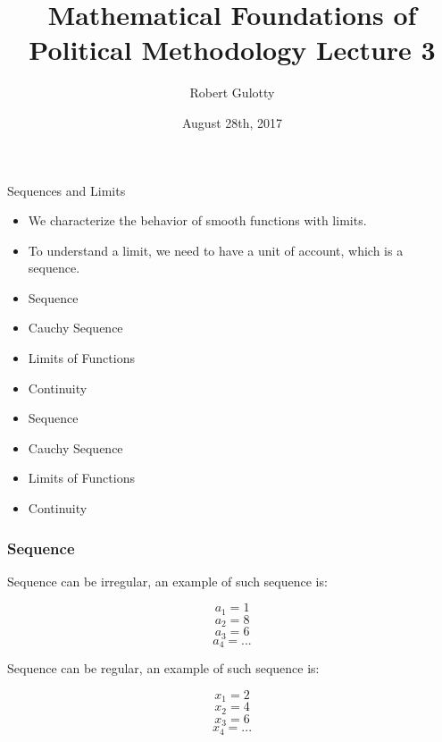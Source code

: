 \documentclass[handout]{beamer}
\title[PLSC 43401] %
{Mathematical Foundations of Political Methodology Lecture 3}
\author{Robert Gulotty}
\institute[University of Chicago]{Department of Political Science \\  University of Chicago}
\date{August 28th, 2017}
\numberwithin{equation}{section}
\begin{document}
\begin{frame}
\titlepage
\end{frame}



\begin{frame}{Sequences and Limits}
\begin{itemize}
\item We characterize the behavior of smooth functions with limits.
\item To understand a limit, we need to have a unit of account, which is a sequence.
\end{itemize}
\end{frame}


\begin{frame}

\begin{itemize}
\item \textcolor{myblack}{Sequence}

\item \textcolor{myblack}{Cauchy Sequence}
\item \textcolor{myblack}{Limits of Functions}
\item \textcolor{myblack}{Continuity}
\end{itemize}

\end{frame}



\begin{frame}

\begin{itemize}
\item \textcolor{myblack}{Sequence}
\item \textcolor{mygray}{Cauchy Sequence}
\item \textcolor{mygray}{Limits of Functions}
\item \textcolor{mygray}{Continuity}
\end{itemize}

\end{frame}


\begin{frame}
\frametitle{Sequence}

Sequence can be irregular, an example of such sequence is:

$$a_{1} = 1$$
$$a_{2} = 8$$
$$a_{3} = 6$$
$$a_{4} = ...$$

Sequence can be regular, an example of such sequence is:

$$x_{1} = 2$$
$$x_{2} = 4$$
$$x_{3} = 6$$
$$x_{4} = ...$$

\end{frame}
\end{document}
